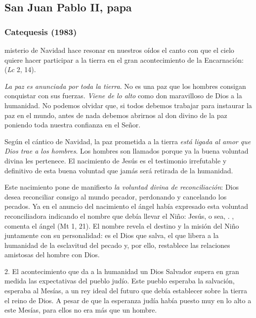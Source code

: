 \subsection{San Juan Pablo II, papa}

\subsubsection{Catequesis (1983)}


\begin{body}
	 misterio de Navidad hace resonar en nuestros oídos el canto con que el cielo quiere hacer participar a la tierra en el gran acontecimiento de la Encarnación:  (\emph{Lc} 2, 14).
	
	\emph{La paz es anunciada por toda la tierra}. No es una paz que los hombres consigan conquistar con sus fuerzas. \emph{Viene de lo alto} como don maravilloso de Dios a la humanidad. No podemos olvidar que, si todos debemos trabajar para instaurar la paz en el mundo, antes de nada debemos abrirnos al don divino de la paz poniendo toda nuestra confianza en el Señor.
	
	Según el cántico de Navidad, la paz prometida a la tierra \emph{está ligada al amor que Dios trae a los hombres}. Los hombres son llamados  porque ya la buena voluntad divina les pertenece. El nacimiento de Jesús es el testimonio irrefutable y definitivo de esta buena voluntad que jamás será retirada de la humanidad.
	
	Este nacimiento pone de manifiesto \emph{la voluntad divina de reconciliación}: Dios desea reconciliar consigo al mundo pecador, perdonando y cancelando los pecados. Ya en el anuncio del nacimiento el ángel había expresado esta voluntad reconciliadora indicando el nombre que debía llevar el Niño: Jesús, o sea, . , comenta el ángel (Mt 1, 21). El nombre revela el destino y la misión del Niño juntamente con su personalidad: es el Dios que salva, el que libera a la humanidad de la esclavitud del pecado y, por ello, restablece las relaciones amistosas del hombre con Dios.
	
	2. El acontecimiento que da a la humanidad un Dios Salvador supera en gran medida las expectativas del pueblo judío. Este pueblo esperaba la salvación, esperaba al Mesías, a un rey ideal del futuro que debía establecer sobre la tierra el reino de Dios. A pesar de que la esperanza judía había puesto muy en lo alto a este Mesías, para ellos no era más que un hombre.
	

\end{body}
